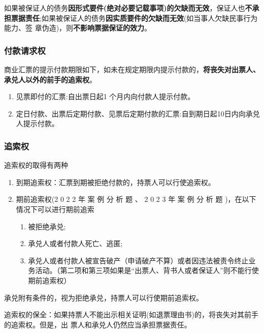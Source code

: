 \documentclass[UTF8,12pt]{ctexart}
\numberwithin{equation}{section} %
\numberwithin{figure}{section}
\numberwithin{table}{section}
\begin{document}
	如果被保证人的债务\textbf{因形式要件(绝对必要记载事项)的欠缺而无效}，保证人也\textbf{不承担票据责任};如果被保证人的债务\textbf{因实质要件的欠缺而无效}(如当事人欠缺民事行为能力、签 章伪造)，则\textbf{不影响票据保证的效力}。
	 
	 
	
	\subsubsection{付款请求权} 
	
	商业汇票的提示付款期限如下，如未在规定期限内提示付款的，\textbf{将丧失对出票人、承兑人以外的前手的追索权}。
	\begin{enumerate}
		\item 见票即付的汇票:自出票日起1 个月内向付款人提示付款。
		
		\item 定日付款、出票后定期付款、见票后定期付款的汇票:自到期日起10日内向承兑人提示付款。
	\end{enumerate}
	
	
	
	\subsubsection{追索权}
	
	追索权的取得有两种
	\begin{enumerate}
		\item 到期追索权：汇票到期被拒绝付款的，持票人可以行使追索权。
		
		\item 期前追索权(2 0 2 2 年 案 例 分 析 题 、 2 0 2 3 年 案 例 分 析 题 )，在以下情况下可以进行期前追索
		\begin{enumerate}
			\item 被拒绝承兑;
			
			\item 承兑人或者付款人死亡、逃匿; 
			
			\item 承兑人或者付款人被宣告破产（申请破产不算）或者因违法被责令终止业务活动。（第二项和第三项如果是“出票人、背书人或者保证人”则不能行使期前追索权）
		\end{enumerate}
	\end{enumerate}

	承兑附有条件的，视为拒绝承兑，持票人可以行使期前追索权。
	
	追索权的保全：如果持票人不能出示相关证明(如退票理由书)的，将丧失对其前手的追索权。但是，出 票人和承兑人仍然应当承担票据责任。
	
\end{document}
